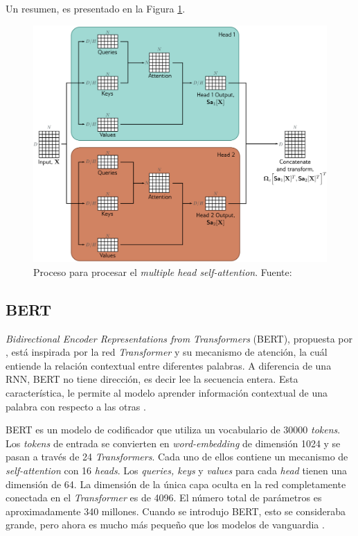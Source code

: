 Un resumen, es presentado en la Figura \ref{fig:mhsa}.

\begin{figure}
	\centering
	\includegraphics[width=\textwidth]{../img/theory/mhsa}
	\caption{Proceso para procesar el \textit{multiple head self-attention}. Fuente: \cite{prince2023understanding}}
	\label{fig:mhsa}
\end{figure}


\subsection{BERT}

\textit{Bidirectional Encoder Representations from Transformers} (BERT), propuesta por \cite{devlin2018bert}, está inspirada por la red \textit{Transformer} y su mecanismo de atención, la cuál entiende la relación contextual entre diferentes palabras. A diferencia de una RNN, BERT no tiene dirección, es decir lee la secuencia entera. Esta característica, le permite al modelo aprender información contextual de una palabra con respecto a las otras \citep{Kelvin_transformer2022}.


BERT es un modelo de codificador que utiliza un vocabulario de 30000 \textit{tokens}. Los \textit{tokens} de entrada se convierten en \textit{word-embedding} de dimensión 1024 y se pasan a través de 24 \textit{Transformers}. Cada uno de ellos contiene un mecanismo de \textit{self-attention} con 16 \textit{heads}. Los \textit{queries, keys} y \textit{values} para cada \textit{head} tienen una dimensión de 64. La dimensión de la única capa oculta en la red completamente conectada en el \textit{Transformer} es de 4096. El número total de parámetros es aproximadamente 340 millones. Cuando se introdujo BERT, esto se consideraba grande, pero ahora es mucho más pequeño que los modelos de vanguardia \citep{prince2023understanding}.

